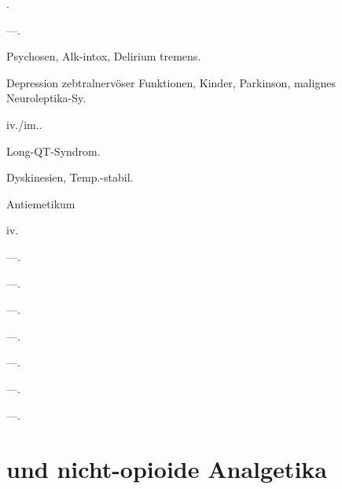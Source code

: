 
{
\begin{MedikamentCharakteristika}
  \item[{\TxItemSpezialitaeten}]  .
  \item[Beschreibung] ---.
  \item[{\TxItemIndikation}] Psychosen, Alk-intox, Delirium tremens.
  \item[{\TxItemKontraindikation}] Depression zebtralnervöser 
  Funktionen, Kinder, Parkinson,
malignes Neuroleptika-Sy.
  \item[{\TxItemDosierung}]  \Mg* iv./im..
  \item[{\TxItemCave}] Long-QT-Syndrom.
  \item[Anm] Dyskinesien, Temp.-stabil.
\end{MedikamentCharakteristika}

 Antiemetikum
\begin{MedikamentCharakteristika}
\item[{\TxItemDosierung}] \Mg* iv.

\end{MedikamentCharakteristika}}
{}




{
\begin{MedikamentCharakteristika}
  \item[{\TxItemSpezialitaeten}] ---.
  \item[Beschreibung] ---.
  \item[{\TxItemIndikation}] ---.
  \item[{\TxItemKontraindikation}] ---.
  \item[{\TxItemDosierung}] ---.
  \item[{\TxItemCave}] ---.
  \item[Anm] ---.
\end{MedikamentCharakteristika}}
{}



\section{ und nicht-opioide Analgetika}

